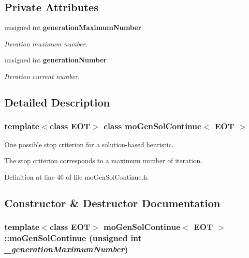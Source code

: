 \subsection*{Private Attributes}
\begin{CompactItemize}
\item 
unsigned int {\bf generation\-Maximum\-Number}\label{classmo_gen_sol_continue_r0}

\begin{CompactList}\small\item\em Iteration maximum number. \item\end{CompactList}\item 
unsigned int {\bf generation\-Number}\label{classmo_gen_sol_continue_r1}

\begin{CompactList}\small\item\em Iteration current number. \item\end{CompactList}\end{CompactItemize}


\subsection{Detailed Description}
\subsubsection*{template$<$class EOT$>$ class mo\-Gen\-Sol\-Continue$<$ EOT $>$}

One possible stop criterion for a solution-based heuristic. 

The stop criterion corresponds to a maximum number of iteration. 



Definition at line 46 of file mo\-Gen\-Sol\-Continue.h.

\subsection{Constructor \& Destructor Documentation}
\subsubsection{\setlength{\rightskip}{0pt plus 5cm}template$<$class EOT$>$ {\bf mo\-Gen\-Sol\-Continue}$<$ EOT $>$::{\bf mo\-Gen\-Sol\-Continue} (unsigned int {\em \_\-generation\-Maximum\-Number})\hspace{0.3cm}{\tt  [inline]}}\label{classmo_gen_sol_continue_a0}


